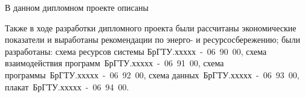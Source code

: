 \Conclusion %

В данном дипломном проекте описаны 

Также в ходе разработки дипломного проекта были рассчитаны экономические
показатели и выработаны рекомендации по
энерго- и ресурсосбережению; были разработаны:
схема ресурсов системы \mbox{БрГТУ.ххххх~-~06~90~00},
схема взаимодействия программ~\mbox{БрГТУ.ххххх~-~06~91~00,} 
схема программы~\mbox{БрГТУ.ххххх~-~06~92~00,}
схема данных~\mbox{БрГТУ.ххххх~-~06~93~00,} 
плакат~\mbox{БрГТУ.ххххх~-~06~94~00}.

